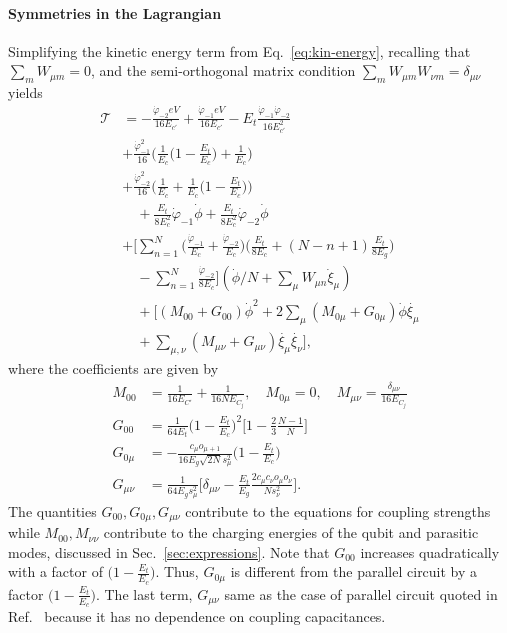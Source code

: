 \documentclass[%
reprint,
superscriptaddress,
 amsmath,amssymb,
 aps,
 prx,
longbibliography,
floatfix,
]{revtex4-2}
\newcommand{\sh}[1]{{\color{blue}{{}[SS: #1]}}}%
\begin{document}
\paragraph{Symmetries in the Lagrangian}
Simplifying the kinetic energy term from Eq.~\ref{eq:kin-energy}, recalling that $\sum_m W_{\mu m}=0$, and the semi-orthogonal matrix condition $\sum_m W_{\mu m}W_{\nu m}=\delta_{\mu\nu}$ yields
\begin{align}
\mathcal{T}&=-\frac{\dot{\varphi}_{-2}eV}{16E_{c'}}+\frac{\dot{\varphi}_{-1}eV}{16E_{c'}}-E_t\frac{\dot{\varphi}_{-1}\dot{\varphi}_{-2}}{16E_{c'}^2}\nonumber\\
    &+\frac{\dot{\varphi}^2_{-1}}{16}\Big(\frac{1}{E_c}\Big(1-\frac{E_t}{E_c}\Big)+\frac{1}{E_c}\Big)\\&+\frac{\dot{\varphi}^2_{-2}}{16}\Big(\frac{1}{E_c}+\frac{1}{E_c}\Big(1-\frac{E_t}{E_c}\Big)\Big)\nonumber\\&\quad+\frac{E_t}{8E_c^2}\dot{\varphi}_{-1}\dot{\phi}+\frac{E_t}{8E_c^2}\dot{\varphi}_{-2}\dot{\phi}\nonumber\\
      &+\Big[\sum_{n=1}^N\Big(\frac{\dot{\varphi}_{-1}}{E_c}+\frac{\dot{\varphi}_{-2}}{E_c}\Big)\Big(\frac{E_t}{8E_c}+(N-n+1)\frac{E_t}{8E_g}\Big)\nonumber\\&\quad-\sum_{n=1}^N\frac{\dot{\varphi}_{-2}}{8E_c}\Big](\dot{\phi}/N+\sum_\mu W_{\mu n}\dot{\xi}_\mu)\nonumber\\
    &\quad+\Big[(M_{00}+G_{00})\dot{\phi}^2+2\sum_{\mu}(M_{0\mu}+G_{0\mu})\dot{\phi}\dot{\xi_\mu}\nonumber\\&\quad+\sum_{\mu,\nu}(M_{\mu\nu}+G_{\mu\nu})\dot{\xi_\mu}\dot{\xi_\nu}\Big],    
    \end{align}
where the coefficients are given by
\begin{align}
    M_{00}&=\frac{1}{16E_{C'}}+\frac{1}{16NE_{C_j}},\quad M_{0\mu}=0,\quad    M_{\mu\nu}=\frac{\delta_{\mu\nu}}{16E_{C_j}}\\
    G_{00}&=\frac{1}{64E_t}\Big(1-\frac{E_t}{E_c}\Big)^2\Big[1-\frac{2}{3}\frac{N-1}{N}\Big]\\
    G_{0\mu}&=-\frac{c_\mu o_{\mu+1}}{16E_g\sqrt{2N}s_\mu^2}\Big(1-\frac{E_t}{E_c}\Big)\\
    G_{\mu\nu}&=\frac{1}{64E_gs_\mu^2}\Big[\delta_{\mu\nu}-\frac{E_t}{E_g}\frac{2c_\mu c_\nu o_\mu o_\nu}{N s_\nu^2}\Big].
\end{align}
\sh{Define c,o.}
The quantities $G_{00},G_{0\mu},G_{\mu\nu}$ contribute to the equations for coupling strengths while $M_{00},M_{\nu\nu}$ contribute to the charging energies of the qubit and parasitic modes, discussed in Sec.~\ref{sec:expressions}. Note that $G_{00}$ increases quadratically with a factor of $\Big(1-\frac{E_t}{E_c}\Big)$. Thus, $G_{0\mu}$ is different from the parallel circuit by a factor $\Big(1-\frac{E_t}{E_c}\Big)$. The last term, $G_{\mu\nu}$ same as the case of parallel circuit quoted in Ref.~\cite{viola2015collective} because it has no dependence on coupling capacitances.
\end{document}
